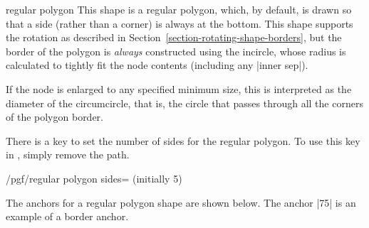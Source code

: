 \begin{shape}{regular polygon}
  This shape is a regular polygon, which, by default, is drawn so that
  a side (rather than a corner) is always at the bottom.
  This shape supports the rotation as described in
  Section~\ref{section-rotating-shape-borders}, but the border of the
  polygon is \emph{always} constructed using the incircle, whose
  radius is calculated to tightly fit the node contents (including
  any |inner sep|).

\begin{codeexample}[]
\end{codeexample}	
	
  If the node is enlarged to any specified minimum size,
  this is interpreted as the diameter of the
  circumcircle, that is, the circle that passes through all the
  corners of the polygon border.

\begin{codeexample}[]
\end{codeexample}	

  There is a \pgfname{} key to set the number of sides for the regular
  polygon.
  To use this key in \tikzname, simply remove the  path.
	
  \begin{key}{/pgf/regular polygon sides= (initially 5)}
  \end{key}

  The anchors for a regular polygon shape are shown below.
  The anchor |75| is an example of a border anchor.

\begin{codeexample}[]
\Huge
{}
\end{codeexample}

\end{shape}

